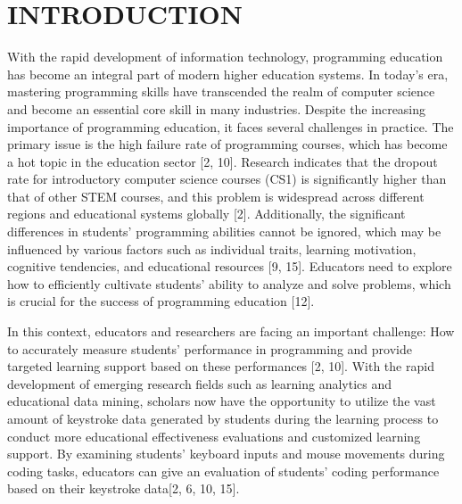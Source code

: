 \documentclass[sigconf,final]{acmart}
\begin{document}


\maketitle
\thispagestyle{fancy}
\section{INTRODUCTION}
With the rapid development of information technology, programming education has become an integral part of modern higher education systems. In today’s era, mastering programming skills 
have transcended the realm of computer science and become an essential core skill in many industries. Despite the increasing importance of programming education, it faces several challenges in practice. The primary issue is the high failure rate of programming courses, which has become a hot topic in the education sector [2, 10]. Research indicates that the dropout rate for introductory computer science courses (CS1) is significantly higher than that of other STEM courses, and this problem is widespread across different regions and educational systems globally [2]. Additionally, the significant differences in students’ programming abilities cannot be ignored, which may be influenced by various factors such as individual traits, learning motivation, cognitive tendencies, and educational resources [9, 15]. Educators need to explore how to efficiently cultivate students’ ability to analyze and solve problems, which is crucial for the success of programming education [12].

In this context, educators and researchers are facing an important challenge: How to accurately measure students’ performance in programming and provide targeted learning support based on 
these performances [2, 10]. With the rapid development of emerging research fields such as learning analytics and educational data mining, scholars now have the opportunity to utilize the vast amount of keystroke data generated by students during the learning process to conduct more educational effectiveness evaluations and customized learning support. By examining students’ keyboard inputs and mouse movements during coding tasks, educators can give an evaluation of students’ coding performance based on their keystroke data[2, 6, 10, 15]. 
\end{document}
